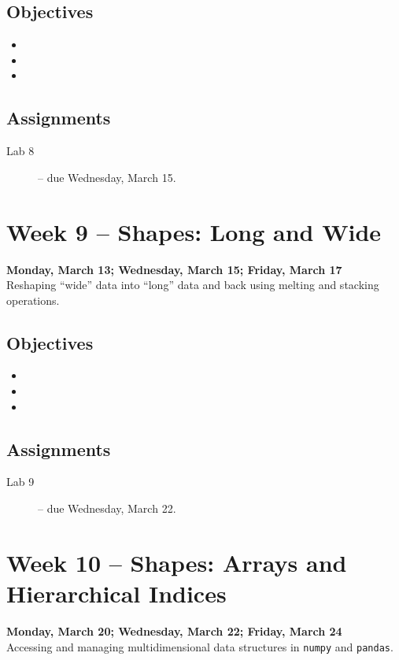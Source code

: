 \documentclass[10pt]{memoir}
\begin{document}
    \subsection{Objectives}
    \begin{itemize}
        \item 
        \item 
        \item 
    \end{itemize}

    \subsection{Assignments}
    \begin{description}%
        \item[Lab 8 ] -- due Wednesday, March 15.
    \end{description}
    
\section{Week 9 -- Shapes: Long and Wide}
\textcolor{CUGold}{\textbf{Monday, March 13; Wednesday, March 15; Friday, March 17}}\\
Reshaping ``wide'' data into ``long'' data and back using melting and stacking operations.

    \subsection{Objectives}
    \begin{itemize}
        \item 
        \item 
        \item 
    \end{itemize}

    \subsection{Assignments}
    \begin{description}%
        \item[Lab 9 ] -- due Wednesday, March 22.
    \end{description}
    
\section{Week 10 -- Shapes: Arrays and Hierarchical Indices}
\textcolor{CUGold}{\textbf{Monday, March 20; Wednesday, March 22; Friday, March 24}}\\
Accessing and managing multidimensional data structures in \texttt{numpy} and \texttt{pandas}.
\end{document}
